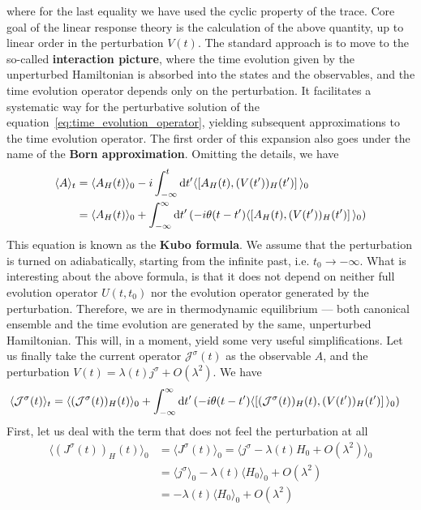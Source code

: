 where for the last equality we have used the cyclic property of the trace. Core goal of the linear response
theory is the calculation of the above quantity, up to linear order in the perturbation \(V(t)\).
The standard approach is to move to the so-called \textbf{interaction picture}, where the time evolution
given by the unperturbed Hamiltonian is absorbed into the states and the observables, and the time evolution
operator depends only on the perturbation. It facilitates a systematic way for the perturbative solution
of the equation~\eqref{eq:time_evolution_operator}, yielding subsequent approximations to the time evolution
operator. The first order of this expansion also goes under the name of the \textbf{Born approximation}.
Omitting the details, we have
\begin{align}
    \langle A \rangle_t & = \langle A_{H}(t) \rangle_0
    - i \int_{-\infty }^{t} \mathrm{d}t^{\prime} \langle \comm*{A_{H}(t)}
    {(V(t^{\prime} ))_{H}(t^{\prime} )} \rangle_0 \nonumber \\
                        & = \langle A_{H}(t) \rangle_0
    + \int_{-\infty }^{\infty } \mathrm{d}t^{\prime} \left(-i \theta (t-t^{\prime} ) \langle \comm*{A_{H}(t) }
        {(V(t^{\prime} ))_{H}(t^{\prime} )} \rangle_0 \right)
    \label{eq:linear_response}
\end{align}
This equation is known as the \textbf{Kubo formula}. We assume that the perturbation is turned on adiabatically,
starting from the infinite past, i.e. \(t_0 \to -\infty \). What is interesting about the above formula, is that
it does not depend on neither full evolution operator \(U(t,t_0)\) nor the evolution operator
generated by the perturbation. Therefore, we are in thermodynamic equilibrium — both canonical ensemble and
the time evolution are generated by the same, unperturbed Hamiltonian. This will, in a moment, yield some
very useful simplifications.
Let us finally take the current operator \(\mathcal{J}^{\sigma }(t)\) as the observable \(A\), and
the perturbation \(V(t) = \lambda(t) j^{\sigma } + O(\lambda^2)\).
We have
\begin{align}
    \langle \mathcal{J}^{\sigma }(t) \rangle_t & = \langle (\mathcal{J}^{\sigma }(t))_{H}(t) \rangle_0 +
    \int_{-\infty}^{\infty } \mathrm{d} t^{\prime} \left(-i \theta (t-t^{\prime} ) \langle \comm*{(\mathcal{J}^{\sigma }(t))_{H}(t) }
        {(V(t^{\prime} ))_{H}(t^{\prime} )} \rangle_0 \right)
\end{align}
First, let us deal with the term that does not feel the perturbation at all
\begin{align}
    \langle (J^{\sigma }(t))_{H}(t) \rangle_0
     & = \langle J^{\sigma }(t) \rangle_0 =
    \langle j^{\sigma } - \lambda(t)H_0 + O(\lambda ^2) \rangle_0 \nonumber               \\
     & = \langle j^{\sigma } \rangle_0 - \lambda(t) \langle H_0 \rangle_0 + O(\lambda ^2) \\
     & =  -\lambda(t) \langle H_0 \rangle_0 + O(\lambda ^2)
\end{align}
